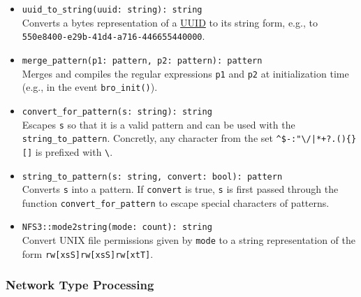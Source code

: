 \documentclass[10pt,landscape]{article}
\begin{document}
\begin{multicols*}{2}
\begin{itemize}
  \item \verb|uuid_to_string(uuid: string): string|\\
    Converts a bytes representation of a
    \href{http://en.wikipedia.org/wiki/Universally_unique_identifier}{UUID} to
    its string form, e.g., to \verb|550e8400-e29b-41d4-a716-446655440000|.
  \item \verb|merge_pattern(p1: pattern, p2: pattern): pattern|\\
    Merges and compiles the regular expressions \verb|p1| and \verb|p2| at
    initialization time (e.g., in the event \verb|bro_init()|).
  \item \verb|convert_for_pattern(s: string): string|\\
    Escapes \verb|s| so that it is a valid pattern and can be used with the
    \verb|string_to_pattern|. Concretly, any character
    from the set \verb#^$-:"\/|*+?.(){}[]# is prefixed with \verb|\|.
  \item \verb|string_to_pattern(s: string, convert: bool): pattern|\\
    Converts \verb|s| into a pattern. If \verb|convert| is true, \verb|s| is
    first passed through the function \verb|convert_for_pattern| to escape
    special characters of patterns.
  \item \verb|NFS3::mode2string(mode: count): string|\\
    Convert UNIX file permissions given by \verb|mode| to a string
    representation of the form \verb|rw[xsS]rw[xsS]rw[xtT]|. 
\end{itemize}

\subsubsection*{Network Type Processing}


\end{multicols*}
\end{document}
